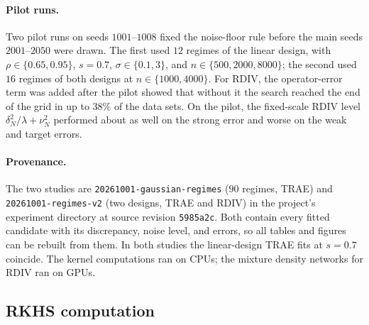 \paragraph{Pilot runs.}
Two pilot runs on seeds $1001$--$1008$ fixed the noise-floor rule before the main seeds $2001$--$2050$ were drawn. The first used $12$ regimes of the linear design, with $\rho\in\{0.65,0.95\}$, $s=0.7$, $\sigma\in\{0.1,3\}$, and $n\in\{500,2000,8000\}$; the second used $16$ regimes of both designs at $n\in\{1000,4000\}$. For RDIV, the operator-error term was added after the pilot showed that without it the search reached the end of the grid in up to $38\%$ of the data sets. On the pilot, the fixed-scale RDIV level $\delta_N^2/\lambda+\nu_N^2$ performed about as well on the strong error and worse on the weak and target errors.

\paragraph{Provenance.}
The two studies are \texttt{20261001-\allowbreak gaussian-\allowbreak regimes} ($90$ regimes, TRAE) and \texttt{20261001-\allowbreak regimes-\allowbreak v2} (two designs, TRAE and RDIV) in the project's experiment directory at source revision \texttt{5985a2c}. Both contain every fitted candidate with its discrepancy, noise level, and errors, so all tables and figures can be rebuilt from them. In both studies the linear-design TRAE fits at $s=0.7$ coincide. The kernel computations ran on CPUs; the mixture density networks for RDIV ran on GPUs.

\subsection{RKHS computation}\label{sec:rkhs_computation}

